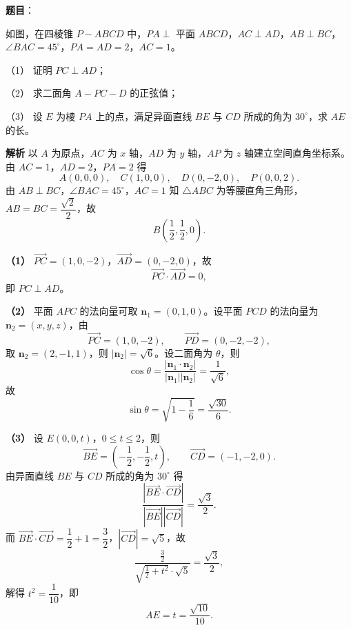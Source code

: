 \begin{answer}

\textbf{题目}：

如图，在四棱锥 $P-ABCD$ 中，$PA\perp$ 平面 $ABCD$，$AC\perp AD$，$AB\perp BC$，$\angle BAC=45^\circ$，$PA=AD=2$，$AC=1$。

（1） 证明 $PC\perp AD$；

（2） 求二面角 $A-PC-D$ 的正弦值；

（3） 设 $E$ 为棱 $PA$ 上的点，满足异面直线 $BE$ 与 $CD$ 所成的角为 $30^\circ$，求 $AE$ 的长。
\nopagebreak[4]
\begin{center}\end{center}
\nopagebreak[4]
\textbf{解析}
以 $A$ 为原点，$AC$ 为 $x$ 轴，$AD$ 为 $y$ 轴，$AP$ 为 $z$ 轴建立空间直角坐标系。由 $AC=1$，$AD=2$，$PA=2$ 得
\nopagebreak[4]
\[A(0,0,0),\quad C(1,0,0),\quad D(0,-2,0),\quad P(0,0,2).\]
由 $AB\perp BC$，$\angle BAC=45^\circ$，$AC=1$ 知 $\triangle ABC$ 为等腰直角三角形，$AB=BC=\dfrac{\sqrt2}2$，故
\nopagebreak[4]
\[B\left(\frac12,\frac12,0\right).\]

\textbf{（1）} $\overrightarrow{PC}=(1,0,-2)$，$\overrightarrow{AD}=(0,-2,0)$，故
\nopagebreak[4]
\[\overrightarrow{PC}\cdot\overrightarrow{AD}=0,\]
即 $PC\perp AD$。

\textbf{（2）} 平面 $APC$ 的法向量可取 $\boldsymbol n_1=(0,1,0)$。设平面 $PCD$ 的法向量为 $\boldsymbol n_2=(x,y,z)$，由
\nopagebreak[4]
\[\overrightarrow{PC}=(1,0,-2),\qquad \overrightarrow{PD}=(0,-2,-2),\]
取 $\boldsymbol n_2=(2,-1,1)$，则 $|\boldsymbol n_2|=\sqrt6$。设二面角为 $\theta$，则
\nopagebreak[4]
\[\cos\theta=\frac{|\boldsymbol n_1\cdot\boldsymbol n_2|}{|\boldsymbol n_1||\boldsymbol n_2|}=\frac1{\sqrt6},\]
故
\nopagebreak[4]
\[\sin\theta=\sqrt{1-\frac16}=\frac{\sqrt{30}}6.\]

\textbf{（3）} 设 $E(0,0,t)$，$0\leqslant t\leqslant2$，则
\nopagebreak[4]
\[\overrightarrow{BE}=\left(-\frac12,-\frac12,t\right),\qquad \overrightarrow{CD}=(-1,-2,0).\]
由异面直线 $BE$ 与 $CD$ 所成的角为 $30^\circ$ 得
\nopagebreak[4]
\[\frac{\left|\overrightarrow{BE}\cdot\overrightarrow{CD}\right|}{|\overrightarrow{BE}||\overrightarrow{CD}|}=\frac{\sqrt3}2.\]
而 $\overrightarrow{BE}\cdot\overrightarrow{CD}=\dfrac12+1=\dfrac32$，$|\overrightarrow{CD}|=\sqrt5$，故
\nopagebreak[4]
\[\frac{\frac32}{\sqrt{\frac12+t^2}\cdot\sqrt5}=\frac{\sqrt3}2,\]
解得 $t^2=\dfrac1{10}$，即
\nopagebreak[4]
\[AE=t=\frac{\sqrt{10}}{10}.\]




\end{answer}
